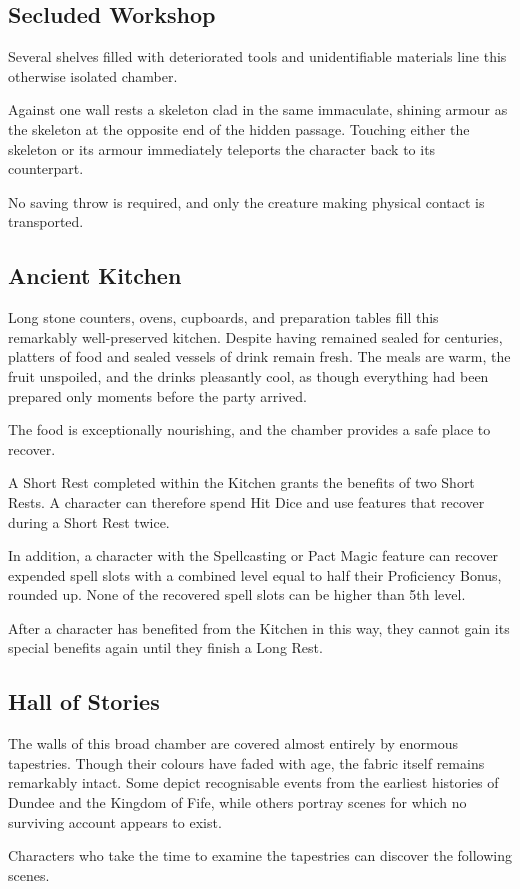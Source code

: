 \subsection*{ Secluded Workshop}
{\entryfont Several shelves filled with deteriorated tools and unidentifiable materials line this otherwise isolated chamber.

Against one wall rests a skeleton clad in the same immaculate, shining armour as the skeleton at the opposite end of the hidden passage. Touching either the skeleton or its armour immediately teleports the character back to its counterpart.

No saving throw is required, and only the creature making physical contact is transported.}

\subsection*{ Ancient Kitchen}
{\entryfont Long stone counters, ovens, cupboards, and preparation tables fill this remarkably well-preserved kitchen. Despite having remained sealed for centuries, platters of food and sealed vessels of drink remain fresh. The meals are warm, the fruit unspoiled, and the drinks pleasantly cool, as though everything had been prepared only moments before the party arrived.

The food is exceptionally nourishing, and the chamber provides a safe place to recover.

A Short Rest completed within the Kitchen grants the benefits of two Short Rests. A character can therefore spend Hit Dice and use features that recover during a Short Rest twice.

In addition, a character with the Spellcasting or Pact Magic feature can recover expended spell slots with a combined level equal to half their Proficiency Bonus, rounded up. None of the recovered spell slots can be higher than 5th level.

After a character has benefited from the Kitchen in this way, they cannot gain its special benefits again until they finish a Long Rest.}

\subsection*{ Hall of Stories}
{\entryfont The walls of this broad chamber are covered almost entirely by enormous tapestries. Though their colours have faded with age, the fabric itself remains remarkably intact. Some depict recognisable events from the earliest histories of Dundee and the Kingdom of Fife, while others portray scenes for which no surviving account appears to exist.

Characters who take the time to examine the tapestries can discover the following scenes.}

